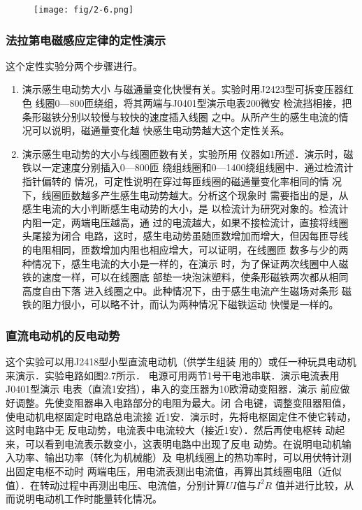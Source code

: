 \begin{figure}[htp]
    \centering
\texttt{[image: fig/2-6.png]}
    \caption{}
\end{figure}

\subsubsection{法拉第电磁感应定律的定性演示}
这个定性实验分两个步骤进行。
\begin{enumerate}
\item 演示感生电动势大小
与磁通量变化快慢有关。实验时用J2423型可拆变压器红色
线圈0—800匝绕组，将其两端与J0401型演示电表200微安
检流挡相接，把条形磁铁分别以较慢与较快的速度插入线圈
之中。从所产生的感生电流的情况可以说明，磁通量变化越
快感生电动势越大这个定性关系。
\item 演示感生电动势的大小与线圈匝数有关，实验所用
仪器如1所述．演示时，磁铁以一定速度分别插入0—800匝
绕组线圈和0—1400绕组线圈中．通过检流计指针偏转的
情况，可定性说明在穿过每匝线圈的磁通量变化率相同的情
况下，线圈匝数越多产生感生电动势越大。分析这个现象时
需要指出的是，从感生电流的大小判断感生电动势的大小，是
以检流计为研究对象的。检流计内阻一定，两端电压越高，通
过的电流越大，如果不接检流计，直接将线圈头尾接为闭合
电路，这时，感生电动势虽随匝数增加而增大，但因每匝导线
的电阻相同，匝数增加内阻也相应增大，可以证明，在线圈匝
数多与少的两种情况下，感生电流的大小是一样的，在演示
时，为了保证两次线圈中人磁铁的速度一样，可以在线圈底
部垫一块泡沫塑料，使条形磁铁两次都从相同高度自由下落
进入线圈之中。此种情况下，由于感生电流产生磁场对条形
磁铁的阻力很小，可以略不计，而认为两种情况下磁铁运动
快慢是一样的。
\end{enumerate}

\subsubsection{直流电动机的反电动势}
这个实验可以用J2418型小型直流电动机（供学生组装
用的）或任一种玩具电动机来演示．实验电路如图2.7所示．
电源可用两节1号干电池串联．演示电流表用J0401型演示
电表（直流1安挡），串入的变压器为10欧滑动变阻器．演示
前应做好调整。先使变阻器串入电路部分的电阻为最大。闭
合电键，调整变阻器阻值，使电动机电枢固定时电路总电流接
近1安．演示时，先将电枢固定住不使它转动，这时电路中无
反电动势，电流表中电流较大（接近1安）．然后再使电枢转
动起来，可以看到电流表示数变小，这表明电路中出现了反电
动势。在说明电动机输入功率、输出功率（转化为机械能）及
电机线圈上的热功率时，可以用伏特计测出固定电枢不动时
两端电压，用电流表测出电流值，再算出其线圈电阻（近似
值）．在转动过程中再测出电压、电流值，分别计算$UI$值与$I^2R$
值并进行比较，从而说明电动机工作时能量转化情况。

